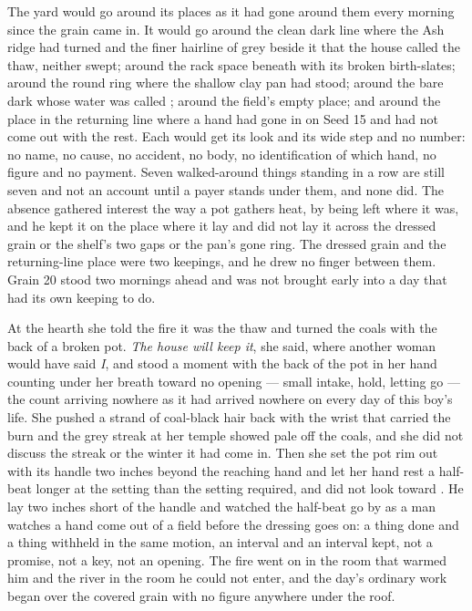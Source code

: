 The yard would go around its places as it had gone around them every morning since the grain came in. It would go around the clean dark line where the Ash ridge had turned and the finer hairline of grey beside it that the house called the thaw, neither swept; around the rack space beneath  with its broken birth-slates; around the round ring where the shallow clay pan had stood; around the bare dark  whose water was called ; around the field's empty place; and around the place in the returning line where a hand had gone in on Seed 15 and had not come out with the rest. Each would get its look and its wide step and no number: no name, no cause, no accident, no body, no identification of which hand, no figure and no payment. Seven walked-around things standing in a row are still seven and not an account until a payer stands under them, and none did. The absence gathered interest the way a pot gathers heat, by being left where it was, and he kept it on the place where it lay and did not lay it across the dressed grain or the shelf's two gaps or the pan's gone ring. The dressed grain and the returning-line place were two keepings, and he drew no finger between them. Grain 20 stood two mornings ahead and was not brought early into a day that had its own keeping to do.

At the hearth she told the fire it was the thaw and turned the coals with the back of a broken pot. \emph{The house will keep it}, she said, where another woman would have said \emph{I}, and stood a moment with the back of the pot in her hand counting under her breath toward no opening --- small intake, hold, letting go --- the count arriving nowhere as it had arrived nowhere on every day of this boy's life. She pushed a strand of coal-black hair back with the wrist that carried the burn and the grey streak at her temple showed pale off the coals, and she did not discuss the streak or the winter it had come in. Then she set the pot rim out with its handle two inches beyond the reaching hand and let her hand rest a half-beat longer at the setting than the setting required, and did not look toward . He lay two inches short of the handle and watched the half-beat go by as a man watches a hand come out of a field before the dressing goes on: a thing done and a thing withheld in the same motion, an interval and an interval kept, not a promise, not a key, not an opening. The fire went on in the room that warmed him and the river in the room he could not enter, and the day's ordinary work began over the covered grain with no figure anywhere under the roof.
